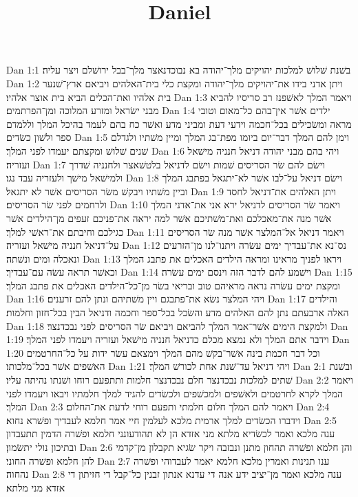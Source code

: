 

\title{Daniel}

Dan 1:1  בשׁנת שׁלושׁ למלכות יהויקים מלך־יהודה בא נבוכדנאצר מלך־בבל ירושׁלם ויצר עליה׃
Dan 1:2  ויתן אדני בידו את־יהויקים מלך־יהודה ומקצת כלי בית־האלהים ויביאם ארץ־שׁנער בית אלהיו ואת־הכלים הביא בית אוצר אלהיו׃
Dan 1:3  ויאמר המלך לאשׁפנז רב סריסיו להביא מבני ישׂראל ומזרע המלוכה ומן־הפרתמים׃
Dan 1:4  ילדים אשׁר אין־בהם כל־מאום וטובי מראה ומשׂכילים בכל־חכמה וידעי דעת ומביני מדע ואשׁר כח בהם לעמד בהיכל המלך וללמדם ספר ולשׁון כשׂדים׃
Dan 1:5  וימן להם המלך דבר־יום ביומו מפת־בג המלך ומיין משׁתיו ולגדלם שׁנים שׁלושׁ ומקצתם יעמדו לפני המלך׃
Dan 1:6  ויהי בהם מבני יהודה דניאל חנניה מישׁאל ועזריה׃
Dan 1:7  וישׂם להם שׂר הסריסים שׁמות וישׂם לדניאל בלטשׁאצר ולחנניה שׁדרך ולמישׁאל מישׁך ולעזריה עבד נגו׃
Dan 1:8  וישׂם דניאל על־לבו אשׁר לא־יתגאל בפתבג המלך וביין משׁתיו ויבקשׁ משׂר הסריסים אשׁר לא יתגאל׃
Dan 1:9  ויתן האלהים את־דניאל לחסד ולרחמים לפני שׂר הסריסים׃
Dan 1:10  ויאמר שׂר הסריסים לדניאל ירא אני את־אדני המלך אשׁר מנה את־מאכלכם ואת־משׁתיכם אשׁר למה יראה את־פניכם זעפים מן־הילדים אשׁר כגילכם וחיבתם את־ראשׁי למלך׃
Dan 1:11  ויאמר דניאל אל־המלצר אשׁר מנה שׂר הסריסים על־דניאל חנניה מישׁאל ועזריה׃
Dan 1:12  נס־נא את־עבדיך ימים עשׂרה ויתנו־לנו מן־הזרעים ונאכלה ומים ונשׁתה׃
Dan 1:13  ויראו לפניך מראינו ומראה הילדים האכלים את פתבג המלך וכאשׁר תראה עשׂה עם־עבדיך׃
Dan 1:14  וישׁמע להם לדבר הזה וינסם ימים עשׂרה׃
Dan 1:15  ומקצת ימים עשׂרה נראה מראיהם טוב ובריאי בשׂר מן־כל־הילדים האכלים את פתבג המלך׃
Dan 1:16  ויהי המלצר נשׂא את־פתבגם ויין משׁתיהם ונתן להם זרענים׃
Dan 1:17  והילדים האלה ארבעתם נתן להם האלהים מדע והשׂכל בכל־ספר וחכמה ודניאל הבין בכל־חזון וחלמות׃
Dan 1:18  ולמקצת הימים אשׁר־אמר המלך להביאם ויביאם שׂר הסריסים לפני נבכדנצר׃
Dan 1:19  וידבר אתם המלך ולא נמצא מכלם כדניאל חנניה מישׁאל ועזריה ויעמדו לפני המלך׃
Dan 1:20  וכל דבר חכמת בינה אשׁר־בקשׁ מהם המלך וימצאם עשׂר ידות על כל־החרטמים האשׁפים אשׁר בכל־מלכותו׃
Dan 1:21  ויהי דניאל עד־שׁנת אחת לכורשׁ המלך׃
Dan 2:1  ובשׁנת שׁתים למלכות נבכדנצר חלם נבכדנצר חלמות ותתפעם רוחו ושׁנתו נהיתה עליו׃
Dan 2:2  ויאמר המלך לקרא לחרטמים ולאשׁפים ולמכשׁפים ולכשׂדים להגיד למלך חלמתיו ויבאו ויעמדו לפני המלך׃
Dan 2:3  ויאמר להם המלך חלום חלמתי ותפעם רוחי לדעת את־החלום׃
Dan 2:4  וידברו הכשׂדים למלך ארמית מלכא לעלמין חיי אמר חלמא לעבדיך ופשׁרא נחוא׃
Dan 2:5  ענה מלכא ואמר לכשׂדיא מלתא מני אזדא הן לא תהודעונני חלמא ופשׁרה הדמין תתעבדון ובתיכון נולי יתשׂמון׃
Dan 2:6  והן חלמא ופשׁרה תהחון מתנן ונבזבה ויקר שׂגיא תקבלון מן־קדמי להן חלמא ופשׁרה החוני׃
Dan 2:7  ענו תנינות ואמרין מלכא חלמא יאמר לעבדוהי ופשׁרה נהחוה׃
Dan 2:8  ענה מלכא ואמר מן־יציב ידע אנה די עדנא אנתון זבנין כל־קבל די חזיתון די אזדא מני מלתא׃

